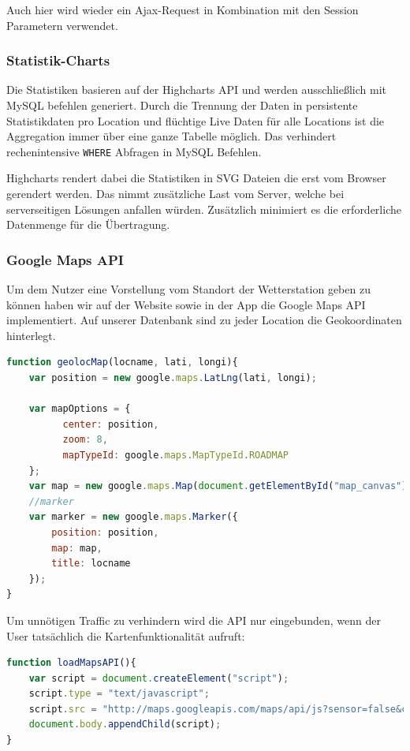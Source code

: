 \documentclass{report}
\begin{document}
Auch hier wird wieder ein Ajax-Request in Kombination mit den Session Parametern verwendet.

\subsubsection{Statistik-Charts}
Die Statistiken basieren auf der Highcharts API \cite{highcharts} und werden ausschlie\ss lich mit MySQL befehlen generiert. Durch die Trennung der Daten in persistente Statistikdaten pro Location und flüchtige Live Daten für alle Locations ist die Aggregation immer über eine ganze Tabelle möglich. Das verhindert rechenintensive \verb+WHERE+ Abfragen in MySQL Befehlen.

Highcharts rendert dabei die Statistiken in SVG Dateien die erst vom Browser gerendert werden. Das nimmt zusätzliche Last vom Server, welche bei serverseitigen Lösungen anfallen würden. Zusätzlich minimiert es die erforderliche Datenmenge für die Übertragung.

\subsubsection{Google Maps API}
Um dem Nutzer eine Vorstellung vom Standort der Wetterstation geben zu können haben wir auf der Website sowie in der App die Google Maps API implementiert.
Auf unserer Datenbank sind zu jeder Location die Geokoordinaten hinterlegt.
\begin{lstlisting}[language=JavaScript, caption=Aus den Geokoordinaten wird eine Karte generiert, label=cbsp6]
function geolocMap(locname, lati, longi){
	var position = new google.maps.LatLng(lati, longi);
	
	var mapOptions = {
          center: position,
          zoom: 8,
          mapTypeId: google.maps.MapTypeId.ROADMAP
    };
    var map = new google.maps.Map(document.getElementById("map_canvas"), mapOptions);
	//marker
	var marker = new google.maps.Marker({
		position: position,
		map: map,
		title: locname
	});
}
\end{lstlisting}
Um unnötigen Traffic zu verhindern wird die API nur eingebunden, wenn der User tatsächlich die Kartenfunktionalität aufruft:
\begin{lstlisting}[language=JavaScript, caption=Lade die Google Maps API, label=cbsp7]
function loadMapsAPI(){
    var script = document.createElement("script");
    script.type = "text/javascript";
    script.src = "http://maps.googleapis.com/maps/api/js?sensor=false&callback=geolocMap_helper";
    document.body.appendChild(script);
}
\end{lstlisting}
\end{document}
